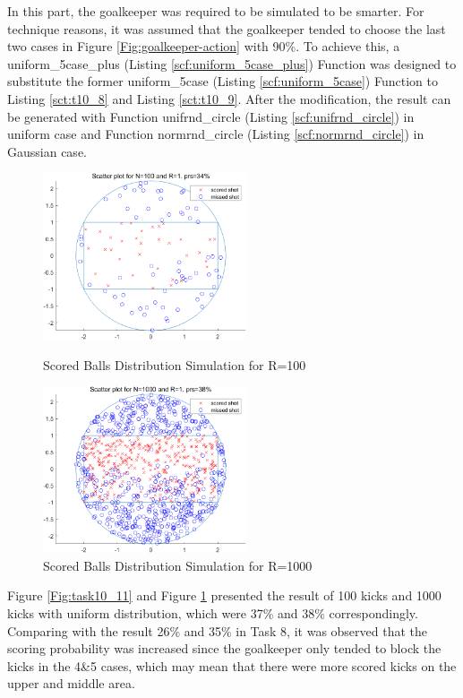 \documentclass[11pt, a4paper]{article}
\begin{document}
In this part, the goalkeeper was required to be simulated to be smarter. For technique reasons, it was assumed that the goalkeeper tended to choose the last two cases in Figure \ref{Fig:goalkeeper-action} with 90\%. To achieve this, a uniform\_5case\_plus (Listing \ref{scf:uniform_5case_plus}) Function was designed to substitute the former uniform\_5case (Listing \ref{scf:uniform_5case}) Function to Listing \ref{sct:t10_8} and Listing \ref{sct:t10_9}. After the modification, the result can be generated with Function unifrnd\_circle (Listing \ref{scf:unifrnd_circle}) in uniform case and Function normrnd\_circle (Listing \ref{scf:normrnd_circle}) in Gaussian case.


\begin{figure}[htbp]
\centering
\begin{minipage}[t]{0.48\textwidth}
\centering
\includegraphics[width=6cm]{img/t10_11.png}
\caption{Scored Balls Distribution Simulation for R=100}
\label{Fig:task10_11}
\end{minipage}
\begin{minipage}[t]{0.48\textwidth}
\centering
\includegraphics[width=6cm]{img/t10_12.png}
\caption{Scored Balls Distribution Simulation for R=1000}
\label{Fig:task10_12}
\end{minipage}
\end{figure}

\newpage

Figure \ref{Fig:task10_11} and Figure \ref{Fig:task10_12} presented the result of 100 kicks and 1000 kicks with uniform distribution, which were 37\% and 38\% correspondingly. Comparing with the result 26\% and 35\% in Task 8, it was observed that the scoring probability was increased since the goalkeeper only tended to block the kicks in the 4\&5 cases, which may mean that there were more scored kicks on the upper and middle area.
\end{document}
